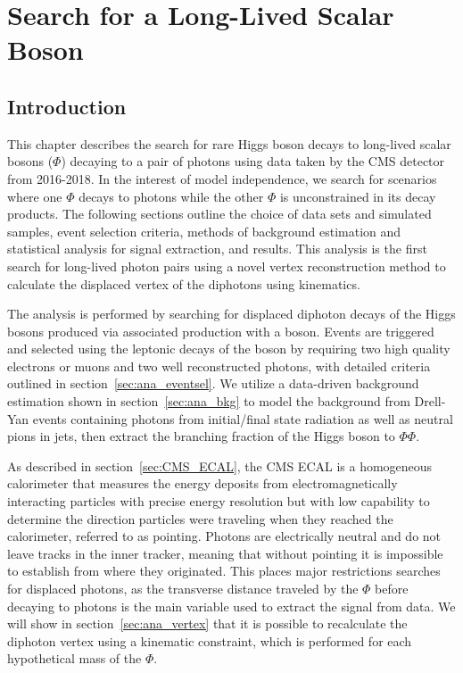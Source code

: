 
\chapter{Search for a Long-Lived Scalar Boson}
\label{chap:ana}
\section{Introduction} \label{sec:ana_intro}
This chapter describes the search for rare Higgs boson decays to long-lived scalar bosons ($\Phi$) decaying to a pair of photons using data taken by the CMS detector from 2016-2018. In the interest of model independence, we search for scenarios where one $\Phi$ decays to photons while the other $\Phi$ is unconstrained in its decay products. The following sections outline the choice of data sets and simulated samples, event selection criteria, methods of background estimation and statistical analysis for signal extraction, and results. This analysis is the first search for long-lived photon pairs using a novel vertex reconstruction method to calculate the displaced vertex of the diphotons using kinematics.

The analysis is performed by searching for displaced diphoton decays of the Higgs bosons produced via associated production with a \PZ boson. Events are triggered and selected using the leptonic decays of the \PZ boson by requiring two high quality electrons or muons and two well reconstructed photons, with detailed criteria outlined in section~\ref{sec:ana_eventsel}. We utilize a data-driven background estimation shown in section~\ref{sec:ana_bkg} to model the background from Drell-Yan events containing photons from initial/final state radiation as well as neutral pions in jets, then extract the branching fraction of the Higgs boson to $\Phi\Phi$.

As described in section~\ref{sec:CMS_ECAL}, the CMS ECAL is a homogeneous calorimeter that measures the energy deposits from electromagnetically interacting particles with precise energy resolution but with low capability to determine the direction particles were traveling when they reached the calorimeter, referred to as pointing. Photons are electrically neutral and do not leave tracks in the inner tracker, meaning that without pointing it is impossible to establish from where they originated. This places major restrictions searches for displaced photons, as the transverse distance traveled by the $\Phi$ before decaying to photons is the main variable used to extract the signal from data. We will show in section~\ref{sec:ana_vertex} that it is possible to recalculate the diphoton vertex using a kinematic constraint, which is performed for each hypothetical mass of the $\Phi$.

